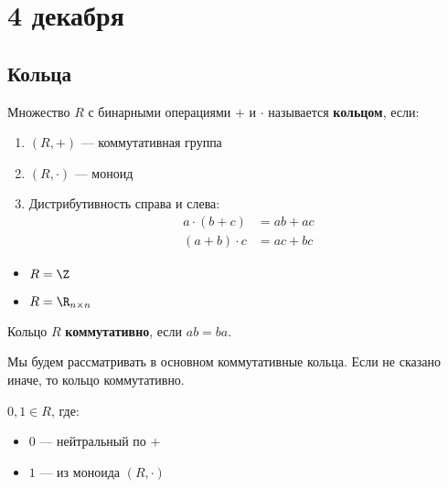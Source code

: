 \chapter{4 декабря}

\section{Кольца}

\begin{definition}
    Множество \(R\) с бинарными операциями \(+\) и \(\cdot\) называется \textbf{кольцом}, если:
    \begin{enumerate}
        \item \((R, +)\) --- коммутативная группа
        \item \((R, \cdot)\) --- моноид
        \item Дистрибутивность справа и слева:
              \begin{align*}
                  a \cdot (b + c) & = ab + ac \\
                  (a + b) \cdot c & = ac + bc
              \end{align*}
    \end{enumerate}
\end{definition}

\begin{example}\itemfix
    \begin{itemize}
        \item \(R = \Z\)
        \item \(R = \R_{n \times n}\)
    \end{itemize}
\end{example}

\begin{definition}
    Кольцо \(R\) \textbf{коммутативно}, если \(ab = ba\).
\end{definition}

\begin{remark}
    Мы будем рассматривать в основном коммутативные кольца. Если не сказано иначе, то кольцо коммутативно.
\end{remark}

\begin{remark}
    \(0, 1 \in R\), где:
    \begin{itemize}
        \item \(0\) --- нейтральный по \(+\)
        \item \(1\) --- из моноида \((R, \cdot)\)
    \end{itemize}
\end{remark}

